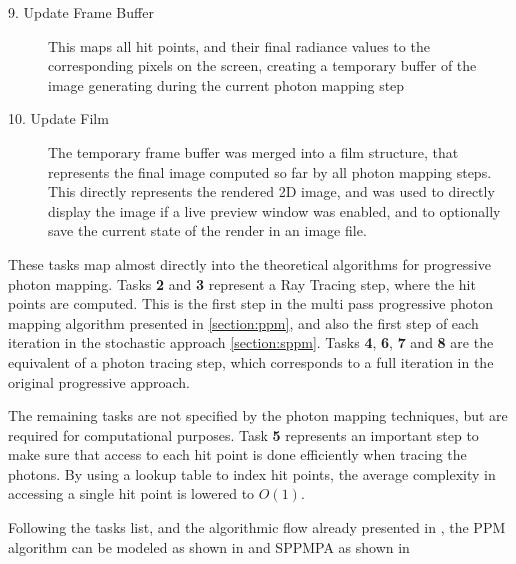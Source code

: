 \documentclass[main.tex]{subfiles}
\begin{document}
\begin{description}
\item[9. Update Frame Buffer] This maps all hit points, and their final radiance values to the corresponding pixels on the screen, creating a temporary buffer of the image generating during the current photon mapping step

\item[10. Update Film] The temporary frame buffer was merged into a film structure, that represents the final image computed so far by all photon mapping steps. This directly represents the rendered 2D image, and was used to directly display the image if a live preview window was enabled, and to optionally save the current state of the render in an image file.

\end{description}

These tasks map almost directly into the theoretical algorithms for progressive photon mapping. Tasks \textbf{2} and \textbf{3} represent a Ray Tracing step, where the hit points are computed. This is the first step in the multi pass progressive photon mapping algorithm presented in \cref{section:ppm}, and also the first step of each iteration in the stochastic approach \cref{section:sppm}. Tasks \textbf{4}, \textbf{6}, \textbf{7} and \textbf{8} are the equivalent of a photon tracing step, which corresponds to a full iteration in the original progressive approach.

The remaining tasks are not specified by the photon mapping techniques, but are required for computational purposes. Task \textbf{5} represents an important step to make sure that access to each hit point is done efficiently when tracing the photons. By using a lookup table to index hit points, the average complexity in accessing a single hit point is lowered to $O(1)$.

Following the tasks list, and the algorithmic flow already presented in , the PPM algorithm can be modeled as shown in  and SPPMPA as shown in 

\end{document}
